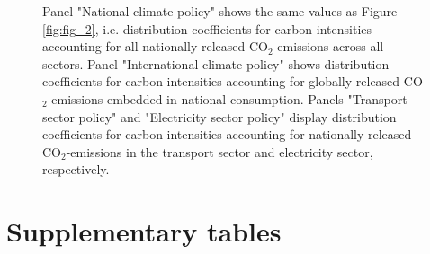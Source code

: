 \documentclass[12pt, a4paper]{article}
\newenvironment{subcaption2}
{\strut
\vspace{-5pt}
\begin{minipage}[b]{0.9\textwidth}
  \hspace*{-\parindent}
  \footnotesize}
 {\end{minipage}}
\begin{document}
\begin{figure}[ht!]
\begin{subcaption2}
    Panel "National climate policy" shows the same values as Figure \ref{fig:fig_2}, i.e. distribution coefficients for carbon intensities accounting for all nationally released CO$_{2}$-emissions across all sectors. Panel "International climate policy" shows distribution coefficients for carbon intensities accounting for globally released CO$_{2}$-emissions embedded in national consumption. Panels "Transport sector policy" and "Electricity sector policy" display distribution coefficients for carbon intensities accounting for nationally released CO$_{2}$-emissions in the transport sector and electricity sector, respectively.
    \end{subcaption2}
\end{figure}

\clearpage

\section{Supplementary tables} \label{sec:tables}


\clearpage


\clearpage


\clearpage


\clearpage


\clearpage


\clearpage


\clearpage

%   



\clearpage


\clearpage


\clearpage
\end{document}
